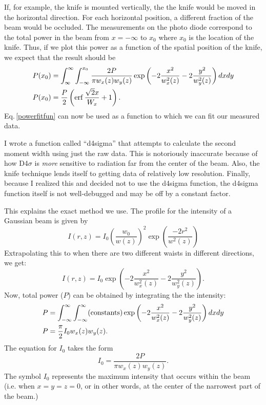 If, for example, the knife is mounted vertically, the the knife would be moved in the horizontal direction. For each horizontal position, a different fraction of the beam would be occluded. The measurements on the photo diode correspond to the total power in the beam from $x=-\infty$ to $x_0$ where $x_0$ is the location of the knife. Thus, if we plot this power as a function of the spatial position of the knife, we expect that the result should be 
\begin{align}
P(x_0)&=\int_{\infty}^{\infty}\int_{-\infty}^{x_0} \frac{2 P}{\pi w_x(z) w_y(z)}\exp \left(-2\frac{x^2}{w_x^2(z)}-2\frac{y^2}{w_y^2(z)}\right) dx dy\\
P(x_0)&=\frac{P}{2} \left(\operatorname{erf} \frac{\sqrt{2} x}{W_x}+1 \right).\label{powerfitfun}
\end{align}
Eq.\,\ref{powerfitfun} can now be used as a function to which we can fit our measured data. 

I wrote a function called ``d4sigma'' that attempts to calculate the second moment width using just the raw data. This is notoriously inaccurate because of how D4$\sigma$ is \emph{more} sensitive to radiation far from the center of the beam. Also, the knife technique lends itself to getting data of relatively low resolution. Finally, because I realized this and decided not to use the d4sigma function, the d4sigma function itself is not well-debugged and may be off by a constant factor.

This explains the exact method we use. The profile for the intensity of a Gaussian beam is given by
\begin{equation} \label{electricFieldExplicitForm}
I(r,z)=I_0\left(\frac{w_0}{w(z)}\right)^2 \exp \left(\frac{-2 r^2}{w^2(z)}\right)
\end{equation}
Extrapolating this to when there are two different waists in different directions, we get: 
\begin{equation}
I(r,z)= I_0\exp \left(-2\frac{x^2}{w_x^2(z)}-2\frac{y^2}{w_y^2(z)}\right) . 
\end{equation}
Now, total power ($P$) can be obtained by integrating the the intensity: 
\begin{align}
P&=\int_{-\infty}^{\infty}\int_{-\infty}^{\infty} ({\rm constants}) \exp \left(-2\frac{x^2}{w_x^2(z)}-2\frac{y^2}{w_y^2(z)}\right) dx dy\\
P&=\frac{\pi}{2} I_0 w_x(z) w_y(z).
\end{align}
The equation for $I_0$ takes the form
\begin{equation}
I_0=\frac{2 P}{\pi w_x(z) w_y(z)}.
\end{equation}
The symbol $I_0$ represents the maximum intensity that occurs within the beam (i.e. when $x=y=z=0$, or in other words, at the center of the narrowest part of the beam.)


